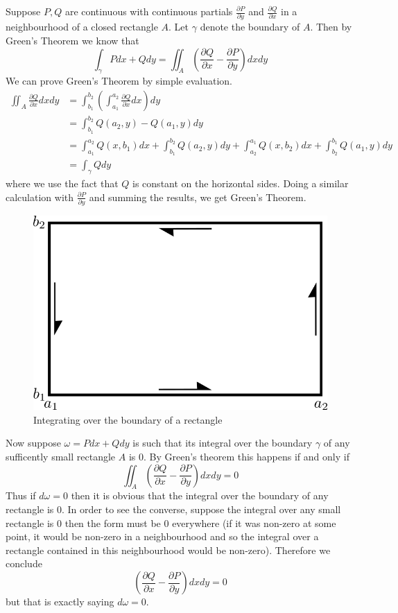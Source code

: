 Suppose $P, Q$ are continuous with continuous partials $\frac{\partial P}{\partial y}$ and $\frac{\partial Q}{\partial x}$ in a neighbourhood of a closed rectangle $A$. Let $\gamma$ denote the boundary of $A$. Then by Green's Theorem we know that 
$$ \int_\gamma P dx + Qdy = \iint_A \left( \frac{\partial Q}{\partial x} - \frac{\partial P}{\partial y} \right)dxdy $$
We can prove Green's Theorem by simple evaluation.
\begin{align*}
    \iint_A \frac{\partial Q}{\partial x} dx dy &= \int_{b_1}^{b_2} \left( \int_{a_1}^{a_2} \frac{\partial Q}{\partial x} dx \right) dy\\
    &= \int_{b_1}^{b_2} Q(a_2, y) - Q(a_1, y) dy\\
    &= \int_{a_1}^{a_2} Q(x, b_1) dx + \int_{b_1}^{b_2} Q(a_2, y) dy + \int_{a_2}^{a_1} Q(x, b_2) dx + \int_{b_2}^{b_1} Q(a_1, y) dy\\
    &= \int_\gamma Q dy
\end{align*}
where we use the fact that $Q$ is constant on the horizontal sides. Doing a similar calculation with $\frac{\partial P}{\partial y}$ and summing the results, we get Green's Theorem.
\begin{figure}
    \centering
    \includegraphics[scale=0.7]{Images/integral_over_rectangle.png}
    \caption{Integrating over the boundary of a rectangle}
    \label{fig:integrate-over-bd-rect}
\end{figure}

Now suppose $\omega = Pdx + Qdy$ is such that its integral over the boundary $\gamma$ of any sufficently small rectangle $A$ is 0. By Green's theorem this happens if and only if
$$ \iint_A \left( \frac{\partial Q}{\partial x} - \frac{\partial P}{\partial y} \right)dxdy = 0 $$
Thus if $d\omega = 0$ then it is obvious that the integral over the boundary of any rectangle is 0.
In order to see the converse, suppose the integral over any small rectangle is 0 then the form must be 0 everywhere (if it was non-zero at some point, it would be non-zero in a neighbourhood and so the integral over a rectangle contained in this neighbourhood would be non-zero). Therefore we conclude
$$ \left( \frac{\partial Q}{\partial x} - \frac{\partial P}{\partial y} \right)dxdy = 0 $$
but that is exactly saying $d\omega = 0$.

